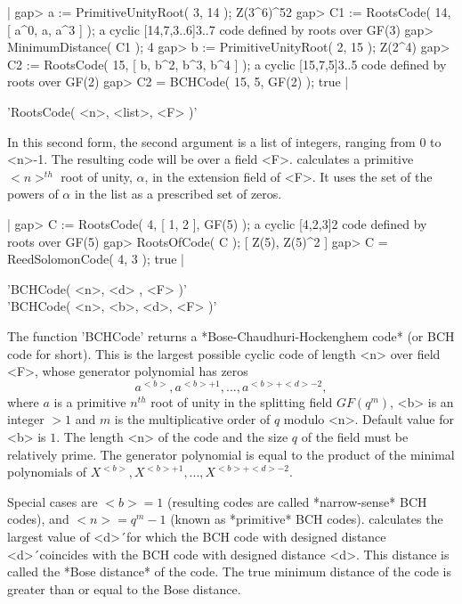 |    gap> a := PrimitiveUnityRoot( 3, 14 );
    Z(3^6)^52
    gap> C1 := RootsCode( 14, [ a^0, a, a^3 ] );
    a cyclic [14,7,3..6]3..7 code defined by roots over GF(3)
    gap> MinimumDistance( C1 );
    4
    gap> b := PrimitiveUnityRoot( 2, 15 );
    Z(2^4)
    gap> C2 := RootsCode( 15, [ b, b^2, b^3, b^4 ] );
    a cyclic [15,7,5]3..5 code defined by roots over GF(2)
    gap> C2 = BCHCode( 15, 5, GF(2) );
    true |

'RootsCode( <n>, <list>, <F> )'

In this second form,  the second argument is a  list of integers, ranging
from 0  to <n>-1. The  resulting code will  be over a field <F>. {\GUAVA}
calculates  a   primitive $<n>^{th}$   root  of unity,  $\alpha$,  in the
extension field of <F>. It uses the set of  the powers of $\alpha$ in the
list as a prescribed set of zeros.

|    gap> C := RootsCode( 4, [ 1, 2 ], GF(5) );
    a cyclic [4,2,3]2 code defined by roots over GF(5)
    gap> RootsOfCode( C );
    [ Z(5), Z(5)^2 ]
    gap> C = ReedSolomonCode( 4, 3 );
    true |


'BCHCode( <n>, <d> , <F> )'\\
'BCHCode( <n>, <b>, <d>, <F> )'

The function 'BCHCode' returns a *Bose-Chaudhuri-Hockenghem code* (or BCH
code for short).  This is the largest  possible cyclic code of length <n>
over field <F>, whose generator polynomial has zeros $$a^{<b>},a^{<b>+1},
..., a^{<b>+<d>-2},$$ where $a$ is a primitive  $n^{th}$ root of unity in
the splitting  field $GF(q^m)$, <b>  is an integer $> 1$  and  $m$ is the
multiplicative  order of  $q$  modulo  <n>.  Default  value  for  <b>  is
$1$. The  length <n> of  the code and the size  $q$ of  the field must be
relatively prime. The generator polynomial is equal to the product of the
minimal polynomials of $X^{<b>}, X^{<b>+1}, ..., X^{<b>+<d>-2}$.

Special cases are $<b>=1$ (resulting codes  are called *narrow-sense* BCH
codes), and  $<n>=q^m-1$ (known  as  *primitive*  BCH  codes).   {\GUAVA}
calculates the largest   value of <d>\'\   for  which the BCH  code  with
designed   distance <d>\'\ coincides   with the  BCH  code with  designed
distance    <d>. This distance  is   called  the *Bose  distance* of  the
code. The true minimum distance of  the code is  greater than or equal to
the Bose distance.

